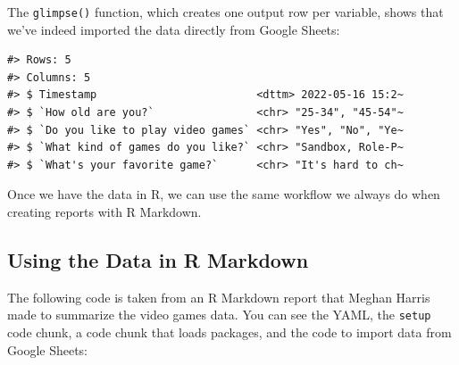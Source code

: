 \documentclass[
]{book}
\newenvironment{Shaded}{\begin{snugshade}}{\end{snugshade}}
\newcommand{\AnnotationTok}[1]{\textcolor[rgb]{0.56,0.35,0.01}{\textbf{\textit{#1}}}}
\newcommand{\CommentTok}[1]{\textcolor[rgb]{0.56,0.35,0.01}{\textit{#1}}}
\newcommand{\InformationTok}[1]{\textcolor[rgb]{0.56,0.35,0.01}{\textbf{\textit{#1}}}}
\begin{document}
The \texttt{glimpse()} function, which creates one output row per variable, shows that we've indeed imported the data directly from Google Sheets:

\begin{verbatim}
#> Rows: 5
#> Columns: 5
#> $ Timestamp                         <dttm> 2022-05-16 15:2~
#> $ `How old are you?`                <chr> "25-34", "45-54"~
#> $ `Do you like to play video games` <chr> "Yes", "No", "Ye~
#> $ `What kind of games do you like?` <chr> "Sandbox, Role-P~
#> $ `What's your favorite game?`      <chr> "It's hard to ch~
\end{verbatim}

Once we have the data in R, we can use the same workflow we always do when creating reports with R Markdown.

\hypertarget{using-the-data-in-r-markdown}{%
\subsection*{Using the Data in R Markdown}\label{using-the-data-in-r-markdown}}

The following code is taken from an R Markdown report that Meghan Harris made to summarize the video games data. You can see the YAML, the \texttt{setup} code chunk, a code chunk that loads packages, and the code to import data from Google Sheets:

\begin{Shaded}
\end{Shaded}
\end{document}
